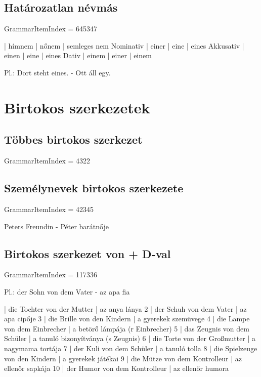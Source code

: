 \documentclass{article}
\newenvironment{desc}{\verbatim}{\endverbatim}
\newenvironment{exmp}{\verbatim}{\endverbatim}
\begin{document}
\subsection{Határozatlan névmás}

GrammarItemIndex = 645347

\begin{desc}
          | hímnem | nőnem | semleges nem 
Nominativ | einer  | eine  | eines 
Akkusativ | einen  | eine  | eines 
Dativ     | einem  | einer | einem 

Pl.: Dort steht eines. - Ott áll egy.
\end{desc}

\section{Birtokos szerkezetek}

\subsection{Többes birtokos szerkezet}

GrammarItemIndex = 4322

\subsection{Személynevek birtokos szerkezete}

GrammarItemIndex = 42345

\begin{desc}
Peters Freundin - Péter barátnője
\end{desc}

\subsection{Birtokos szerkezet von + D-val}

GrammarItemIndex = 117336

\begin{desc}
Pl.: der Sohn von dem Vater - az apa fia
\end{desc}

\begin{exmp}
1 | die Tochter von der Mutter | az anya lánya
2 | der Schuh von dem Vater | az apa cipője
3 | die Brille von den Kindern | a gyerekek szemüvege
4 | die Lampe von dem Einbrecher | a betörő lámpája (r Einbrecher)
5 | das Zeugnis von dem Schüler | a tanuló bizonyítványa (s Zeugnis)
6 | die Torte von der Großmutter | a nagymama tortája
7 | der Kuli von dem Schüler | a tanuló tolla
8 | die Spielzeuge von den Kindern | a gyerekek játékai
9 | die Mütze von dem Kontrolleur | az ellenőr sapkája
10 | der Humor von dem Kontrolleur | az ellenőr humora
\end{exmp}
\end{document}
